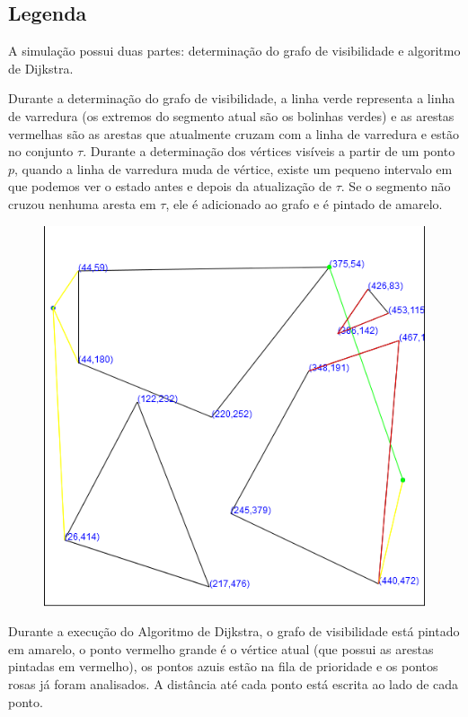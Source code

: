 \documentclass[11pt]{article} %
\begin{document}
\subsection{Legenda}


A simulação possui duas partes: determinação do grafo de visibilidade e algoritmo de Dijkstra.

Durante a determinação do grafo de visibilidade, a linha verde representa a linha de varredura (os extremos do segmento atual são os bolinhas verdes) e as arestas vermelhas são as arestas que atualmente cruzam com a linha de varredura e estão no conjunto $\tau$. Durante a determinação dos vértices visíveis a partir de um ponto $p$, quando a linha de varredura muda de vértice, existe um pequeno intervalo em que podemos ver o estado antes e depois da atualização de $\tau$. Se o segmento não cruzou nenhuma aresta em $\tau$, ele é adicionado ao grafo e é pintado de amarelo.

\begin{figure}[!htp]
	\begin{center}
		\includegraphics[scale=0.5]{img/visgraph.png}
	\end{center}	
\end{figure}

Durante a execução do Algoritmo de Dijkstra, o grafo de visibilidade está pintado em amarelo, o ponto vermelho grande é o vértice atual (que possui as arestas pintadas em vermelho), os pontos azuis estão na fila de prioridade e os pontos rosas já foram analisados. A distância até cada ponto está escrita ao lado de cada ponto.
\end{document}
